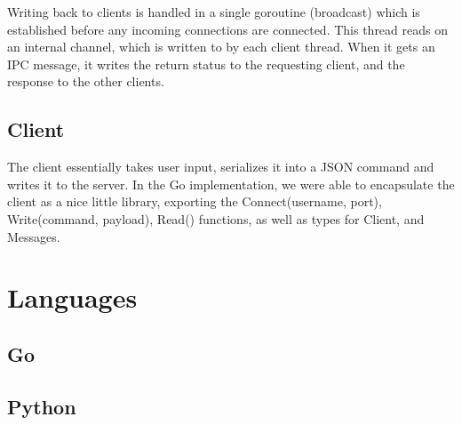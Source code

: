 \documentclass[10pt, letterpaper]{article}
\begin{document}
Writing back to clients is handled in a single goroutine (broadcast) which is 
established before any incoming connections are connected. This thread reads 
on an internal channel, which is written to by each client thread. When it 
gets an IPC message, it writes the return status to the requesting client, and 
the response to the other clients.

\subsection*{Client}

The client essentially takes user input, serializes it into a JSON command 
and writes it to the server. In the Go implementation, we were able to 
encapsulate the client as a nice little library, exporting the 
Connect(username, port), Write(command, payload), Read() functions, as well 
as types for Client, and Messages.

\section*{Languages}

\subsection*{Go}

\subsection*{Python}
\end{document}
